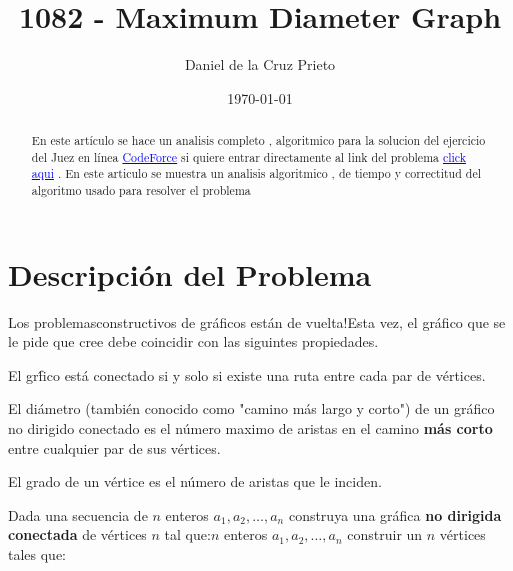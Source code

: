 \documentclass[10pt]{article}
\begin{document}
    \title{1082 - Maximum Diameter Graph}
    \author{Daniel de la Cruz Prieto}
    \date{\today}
    \maketitle

    \begin{abstract}
        \noindent En este art\'iculo se hace un analisis completo , 
        algoritmico para la solucion del ejercicio del Juez en 
        l\'inea \href{https://codeforces.com}{\textcolor{blue}{CodeForce}} 
        si quiere entrar directamente al link del problema 
        \href{https://codeforces.com/problemset/problem/1082/D}{\textcolor{blue}{click aqui}} 
        . En este articulo se muestra un analisis algoritmico , de tiempo y correctitud del 
        algoritmo usado para resolver el problema 
    \end{abstract}

    \section*{Descripci\'on del Problema } 
    
    \begin{flushleft}
        Los problemasconstructivos de gr\'aficos est\'an de vuelta!Esta vez, el gr\'afico que se le pide que cree debe coincidir con las siguintes propiedades.
    \end{flushleft}

    \begin{flushleft}
       El gr\'fico est\'a conectado si y solo si existe una ruta entre cada par de v\'ertices.
    \end{flushleft}

    \begin{flushleft}
        El di\'ametro (tambi\'en conocido como "camino m\'as largo y corto") de un gr\'afico no dirigido conectado es el n\'umero maximo de aristas en el camino {\bf m\'as corto} entre cualquier par de sus v\'ertices.
    \end{flushleft}

    \begin{flushleft}
       El grado de un v\'ertice es el n\'umero de aristas que le inciden.
    \end{flushleft}

    \begin{flushleft}
        Dada una secuencia de $n$ enteros $a_1,a_2,\dots,a_n$ construya una gr\'afica {\bf no dirigida conectada} de v\'ertices $n$ tal que:$n$ enteros $a_1,a_2,\dots,a_n$ construir un $n$ v\'ertices tales que:
    \end{flushleft}
\end{document}
